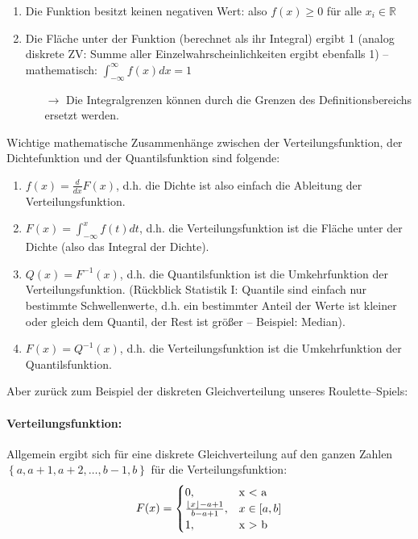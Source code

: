 \documentclass[a4paper]{article}
\DeclarePairedDelimiter\floor{\lfloor}{\rfloor}
\begin{document}
\begin{enumerate}
    \item Die Funktion besitzt keinen negativen Wert: also $f(x)\geq 0$ für alle $x_i \in \mathbb{R}$
    \item Die Fläche unter der Funktion (berechnet als ihr Integral) ergibt 1 (analog diskrete ZV: Summe aller Einzelwahrscheinlichkeiten ergibt ebenfalls 1) -- mathematisch: $\int_{-\infty}^{\infty} f(x) dx = 1$
    \begin{itemize}
	\item[$\rightarrow$] Die Integralgrenzen können durch die Grenzen des Definitionsbereichs ersetzt werden.
	\end{itemize}
\end{enumerate}

\clearpage

\noindent Wichtige mathematische Zusammenhänge zwischen der Verteilungsfunktion, der Dichtefunktion und der Quantilsfunktion sind folgende:

\begin{enumerate}
    \item $f(x)= \frac{d}{dx} F(x)$, d.h. die Dichte ist also einfach die Ableitung der Verteilungsfunktion.
    \item $F(x)= \int_{-\infty}^{x} f(t)dt$, d.h. die Verteilungsfunktion ist die Fläche unter der Dichte (also das Integral der Dichte).
    \item $Q(x)= F^{-1}(x)$, d.h. die Quantilsfunktion ist die Umkehrfunktion der Verteilungsfunktion. (Rückblick Statistik I: Quantile sind einfach nur bestimmte Schwellenwerte, d.h. ein bestimmter Anteil der Werte ist kleiner oder gleich dem Quantil, der Rest ist größer -- Beispiel: Median).
    \item $F(x) = Q^{-1}(x)$, d.h. die Verteilungsfunktion ist die Umkehrfunktion der Quantilsfunktion.
\end{enumerate}

\noindent Aber zurück zum Beispiel der diskreten Gleichverteilung unseres Roulette--Spiels:\\

\paragraph{Verteilungsfunktion:}
Allgemein ergibt sich für eine diskrete Gleichverteilung auf den ganzen Zahlen 
$\left\{a,a+1,a+2,\ldots, b-1, b\right\}$ für die Verteilungsfunktion:
\begin{equation*}
    F(x)=\begin{cases}
			0, & \text{x < a}\\
            \frac{\floor*{x}-a+1}{b-a+1}, & \text{$x \in [a,b]$}\\
            1, & \text{x > b}
		 \end{cases}
\end{equation*}
\end{document}
